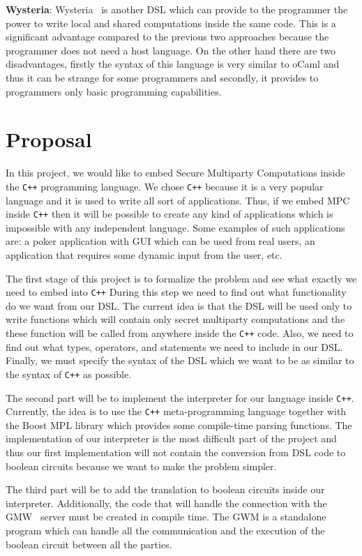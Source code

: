 \documentclass[paper=a4, fontsize=11pt]{scrartcl} %
\numberwithin{equation}{section} %
\numberwithin{figure}{section} %
\numberwithin{table}{section} %
\begin{document}
\noindent
\textbf{Wysteria}: Wysteria~\cite{Wysteria} is another DSL which can provide to the programmer the power to write local and shared computations inside the same code. This is a significant advantage compared to the previous two approaches because the programmer does not need a host language. On the other hand there are two disadvantages, firstly the syntax of this language is very similar to oCaml and thus it can be strange for some programmers and secondly, it provides to programmers only basic programming capabilities.
 
\section{Proposal}

In this project, we would like to embed Secure Multiparty Computations inside the {\tt C++} programming language. We chose {\tt C++} because it is a very popular language and it is used to write all sort of applications. Thus, if we embed MPC inside {\tt C++} then it will be possible to create any kind of applications which is impossible with any independent language. Some examples of such applications are: a poker application with GUI which can be used from real users, an application that requires some dynamic input from the user, etc.

The first stage of this project is to formalize the problem and see what exactly we need to embed into {\tt C++}  During this step we need to find out what functionality do we want from our DSL. The current idea is that the DSL will be used only to write functions which will contain only secret multiparty computations and the these function will be called from anywhere inside the {\tt C++} code. Also, we need to find out what types, operators, and statements we need to include in our DSL. Finally, we must specify the syntax of the DSL which we want to be as similar to the syntax of {\tt C++} as possible.

The second part will be to implement the interpreter for our language inside {\tt C++}. Currently, the idea is to use the {\tt C++} meta-programming language together with the Boost MPL library which provides some compile-time parsing functions. The implementation of our interpreter is the most difficult part of the project and thus our first implementation will not contain the conversion from DSL code to boolean circuits because we want to make the problem simpler. 

The third part will be to add the translation to boolean circuits inside our interpreter. Additionally, the code that will handle the connection with the GMW~\cite{GMW} server must be created in compile time. The GWM is a standalone program which can handle all the communication and the execution of the boolean circuit between all the parties.
\end{document}
